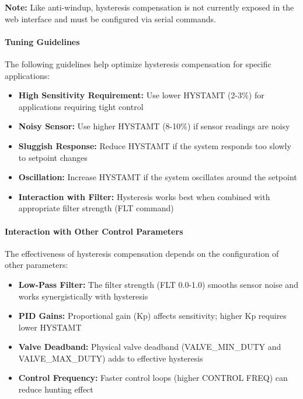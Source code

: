 \documentclass[12pt,a4paper]{article}
\begin{document}
\textbf{Note:} Like anti-windup, hysteresis compensation is not currently exposed in the web interface and must be configured via serial commands.

\paragraph{Tuning Guidelines}

The following guidelines help optimize hysteresis compensation for specific applications:

\begin{itemize}
    \item \textbf{High Sensitivity Requirement:} Use lower HYSTAMT (2-3\%) for applications requiring tight control
    \item \textbf{Noisy Sensor:} Use higher HYSTAMT (8-10\%) if sensor readings are noisy
    \item \textbf{Sluggish Response:} Reduce HYSTAMT if the system responds too slowly to setpoint changes
    \item \textbf{Oscillation:} Increase HYSTAMT if the system oscillates around the setpoint
    \item \textbf{Interaction with Filter:} Hysteresis works best when combined with appropriate filter strength (FLT command)
\end{itemize}

\paragraph{Interaction with Other Control Parameters}

The effectiveness of hysteresis compensation depends on the configuration of other parameters:

\begin{itemize}
    \item \textbf{Low-Pass Filter:} The filter strength (FLT 0.0-1.0) smooths sensor noise and works synergistically with hysteresis
    \item \textbf{PID Gains:} Proportional gain (Kp) affects sensitivity; higher Kp requires lower HYSTAMT
    \item \textbf{Valve Deadband:} Physical valve deadband (VALVE\_MIN\_DUTY and VALVE\_MAX\_DUTY) adds to effective hysteresis
    \item \textbf{Control Frequency:} Faster control loops (higher CONTROL FREQ) can reduce hunting effect
\end{itemize}
\end{document}

